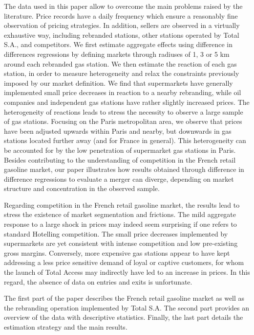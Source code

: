 \documentclass[english]{article}
\begin{document}
The data used in this paper allow to overcome the main problems raised by the literature. Price records have a daily frequency which ensure a reasonably fine observation of pricing strategies. In addition, sellers are observed in a virtually exhaustive way, including rebranded stations, other stations operated by Total S.A., and competitors. We first estimate aggregate effects using difference in differences regressions by defining markets through radiuses of 1, 3 or 5 km around each rebranded gas station. We then estimate the reaction of each gas station, in order to measure heterogeneity and relax the constraints previously imposed by our market definition. We find that supermarkets have generally implemented small price decreases in reaction to a nearby rebranding, while oil companies and independent gas stations have rather slightly increased prices. The heterogeneity of reactions leads to stress the necessity to observe a large sample of gas stations. Focusing on the Paris metropolitan area, we observe that prices have been adjusted upwards within Paris and nearby, but downwards in gas stations located further away (and for France in general). This heterogeneity can be accounted for by the low penetration of supermarket gas stations in Paris. Besides contributing to the understanding of competition in the French retail gasoline market, our paper illustrates how results obtained through difference in difference regressions to evaluate a merger can diverge, depending on market structure and concentration in the observed sample.

Regarding competition in the French retail gasoline market, the results lead to stress the existence of market segmentation and frictions. The mild aggregate response to a large shock in prices may indeed seem surprising if one refers to standard Hotelling competition. The small price decreases implemented by supermarkets are yet consistent with intense competition and low pre-existing gross margins. Conversely, more expensive gas stations appear to have kept addressing a less price sensitive demand of loyal or captive customers, for whom the launch of Total Access may indirectly have led to an increase in prices. In this regard, the absence of data on entries and exits is unfortunate.

The first part of the paper describes the French retail gasoline market as well as the rebranding operation implemented by Total S.A. The second part provides an overview of the data with descriptive statistics. Finally, the last part details the estimation strategy and the main results.
\end{document}
